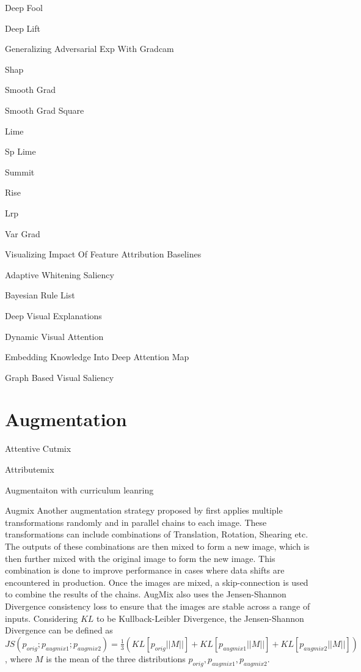 Deep Fool

Deep Lift

Generalizing Adversarial Exp With Gradcam

Shap

Smooth Grad

Smooth Grad Square

Lime

Sp Lime

Summit

Rise

Lrp

Var Grad

Visualizing Impact Of Feature Attribution Baselines

Adaptive Whitening Saliency

Bayesian Rule List


Deep Visual Explanations

Dynamic Visual Attention

Embedding Knowledge Into Deep Attention Map

Graph Based Visual Saliency


\section{Augmentation}
Attentive Cutmix

Attributemix

Augmentaiton with curriculum leanring

Augmix
Another augmentation strategy proposed by \cite{hendrycksAugMixSimpleData2020} first applies multiple transformations randomly and in parallel chains to each image. These transformations can include combinations of Translation, Rotation, Shearing etc. The outputs of these combinations are then mixed to form a new image, which is then further mixed with the original image to form the new image. This combination is done to improve performance in cases where data shifts are encountered in production. Once the images are mixed, a skip-connection is used to combine the results of the chains. AugMix also uses the Jensen-Shannon Divergence consistency loss \cite{linDivergenceMeasuresBased} to ensure that the images are stable across a range of inputs. Considering $KL$ to be Kullback-Leibler Divergence, the Jensen-Shannon Divergence can be defined as $
JS(p_{orig}; p_{augmix1};p_{augmix2}) = \frac{1}{3}(KL[p_{orig}||M||]+KL[p_{augmix1}||M||]+KL[p_{augmix2}||M||])
$, where $M$ is the mean of the three distributions $p_{orig}, p_{augmix1}, p_{augmix2}$.

